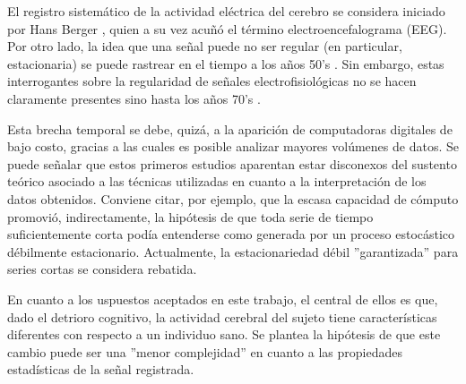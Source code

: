 \documentclass[12pt,a4paper]{mitthesis}
\begin{document}
El registro sistem\'atico de la actividad el\'ectrica del cerebro se considera iniciado por Hans 
Berger \cite{Berger29}, quien a su vez acu\~n\'o el t\'ermino electroencefalograma (EEG).
Por otro lado, la idea que una se\~nal puede no ser regular (en particular, estacionaria) se puede 
rastrear en el tiempo a los a\~nos 50’s \cite{Page52,Silverman57}. 
Sin embargo, estas interrogantes sobre la regularidad de se\~nales electrofisiol\'ogicas no se 
hacen claramente presentes sino hasta los a\~nos 70's \cite{Kawabata73,McEwen75,Cohen77,Sugimoto78}.

Esta brecha temporal se debe, quiz\'a, a la aparici\'on de computadoras digitales de bajo costo, 
gracias a las cuales es posible analizar mayores vol\'umenes de datos.
Se puede se\~nalar que estos primeros estudios aparentan estar disconexos del sustento te\'orico 
asociado a las t\'ecnicas  utilizadas en cuanto a la interpretaci\'on de los datos obtenidos. 
Conviene citar, por ejemplo, que la escasa capacidad de c\'omputo promovi\'o, indirectamente, la 
hip\'otesis de que {toda} serie de tiempo suficientemente corta pod\'ia entenderse como generada 
por un proceso estoc\'astico d\'ebilmente estacionario.
Actualmente, la estacionariedad d\'ebil ''garantizada'' para series cortas se considera rebatida\cite{Melard89,Adak98,Klonowski09}.

En cuanto a los uspuestos aceptados en este trabajo, el central de ellos es que, dado el detrioro
cognitivo, la actividad cerebral del sujeto tiene caracter\'isticas diferentes con respecto a un
individuo sano. Se plantea la hip\'otesis de que este cambio puede ser una ''menor complejidad'' 
en cuanto a las propiedades estad\'isticas de la se\~nal registrada. 
\end{document}
